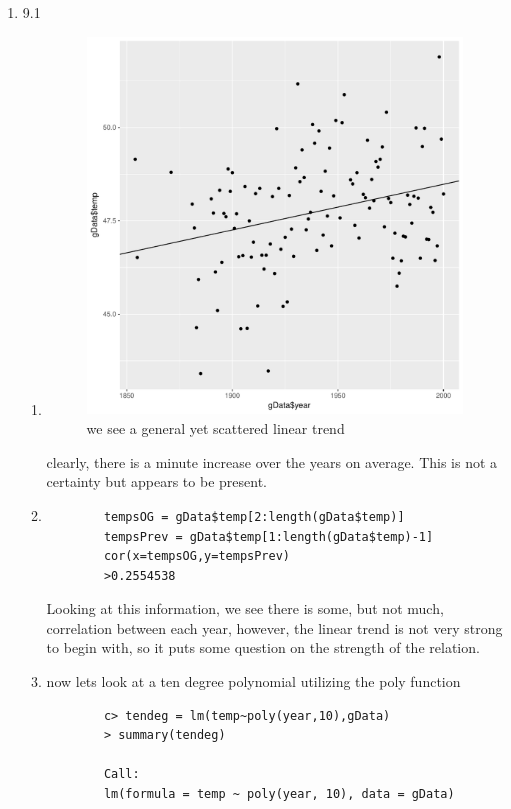\documentclass[11pt]{article}
\begin{document}
\begin{enumerate}
\item 9.1
\begin{enumerate}
	\item 
	\begin{figure}[H]
		\centering
		\includegraphics[width=10cm,height=10cm]{mayblin}
		\caption[mayblin]{we see a general yet scattered linear trend }
		\label{aadata}
	\end{figure}
	clearly, there is a minute increase over the years on average. This is not a certainty but appears to be present.
	\item
	\begin{verbatim}
		tempsOG = gData$temp[2:length(gData$temp)]
		tempsPrev = gData$temp[1:length(gData$temp)-1]
		cor(x=tempsOG,y=tempsPrev)
		>0.2554538
	\end{verbatim}
	Looking at this information, we see there is some, but not much, correlation between each year, however, the linear trend is not very strong to begin with, so it puts some question on the strength of the relation.
	\item
	now lets look at a ten degree polynomial utilizing the poly function
	\begin{verbatim}
		c> tendeg = lm(temp~poly(year,10),gData)
		> summary(tendeg)
		
		Call:
		lm(formula = temp ~ poly(year, 10), data = gData)
		

\end{verbatim}
\end{enumerate}
\end{enumerate}
\end{document}
